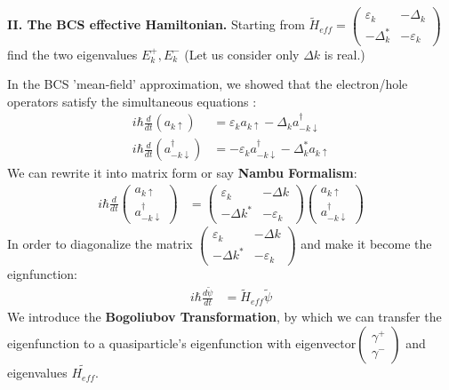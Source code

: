 \documentclass[answers]{exam}
\begin{document}
\begin{questions}
\vspace{5mm}
\textbf{II. The BCS effective Hamiltonian.}
\vspace{5mm}
\question Starting from 
$\tilde{H}_{e f f}=\left(\begin{array}{cc}
    \varepsilon_{k} & -\Delta_{k} \\
    -\Delta_{k}^{*} & -\varepsilon_{k}
    \end{array}\right)$
find the two eigenvalues $E_{k}^{+},E_{k}^{-}$ (Let us consider only $\Delta k$ is real.)
\begin{solution}
In the BCS 'mean-field' approximation, we showed that the electron/hole operators satisfy the simultaneous equations :
\begin{align*}
i \hbar \frac{d}{d t}\left(a_{k \uparrow}\right) &=\varepsilon_{k} a_{k \uparrow}-\Delta_{k} a_{-k \downarrow}^{\dagger} \\
i \hbar \frac{d}{d t}\left(a_{-k \downarrow}^{\dagger}\right) &=-\varepsilon_{k} a_{-k \downarrow}^{\dagger}-\Delta_{k}^{*} a_{k \uparrow}
\end{align*}
We can rewrite it into matrix form or say \textbf{Nambu Formalism}:
\begin{align*}
i \hbar \frac{d}{d t}\left(\begin{array}{l}a_{k \uparrow } \\a_{-k\downarrow }^{\dagger }\end{array}\right)&=\left(\begin{array}{cc}
\varepsilon_{k} & -\Delta k \\
-\Delta{k}^{*} & -\varepsilon_{k}
\end{array}\right)\left(\begin{array}{c}
a_{k \uparrow } \\
a_{-k\downarrow }^{\dagger }
\end{array}\right) 
\end{align*}
In order to diagonalize the matrix $\left(\begin{array}{cc}
\varepsilon_{k} & -\Delta k \\
-\Delta{k}^{*} & -\varepsilon_{k}
\end{array}\right)$ and make it become the eignfunction:
\begin{align*}
i \hbar \frac{d \tilde{\psi}}{d t}&=\tilde{H}_{e f f} \tilde{\psi}
\end{align*}
We introduce the \textbf{Bogoliubov Transformation}, by which we can transfer the eigenfunction to a quasiparticle's eigenfunction with eigenvector$\left(\begin{array}{c}\gamma^{+} \\\gamma^{-}\end{array}\right)$ and eigenvalues $\tilde{{H}_{eff}}$.\\

\end{solution}
\end{questions}
\end{document}
